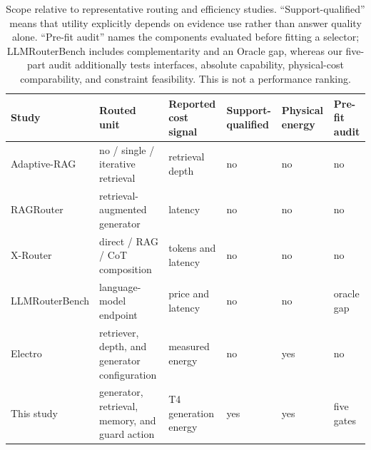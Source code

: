 \begin{table}[t]
\caption{Scope relative to representative routing and efficiency studies. ``Support-qualified'' means that utility explicitly depends on evidence use rather than answer quality alone. ``Pre-fit audit'' names the components evaluated before fitting a selector; LLMRouterBench includes complementarity and an Oracle gap, whereas our five-part audit additionally tests interfaces, absolute capability, physical-cost comparability, and constraint feasibility. This is not a performance ranking.}
\label{tab:related-scope}
\centering
\small
\begin{tabularx}{\textwidth}{@{}lXXlll@{}}
\toprule
Study & Routed unit & Reported cost signal & Support-qualified & Physical energy & Pre-fit audit \\
\midrule
Adaptive-RAG & no / single / iterative retrieval & retrieval depth & no & no & no \\
RAGRouter & retrieval-augmented generator & latency & no & no & no \\
X-Router & direct / RAG / CoT composition & tokens and latency & no & no & no \\
LLMRouterBench & language-model endpoint & price and latency & no & no & oracle gap \\
Electro & retriever, depth, and generator configuration & measured energy & no & yes & no \\
This study & generator, retrieval, memory, and guard action & T4 generation energy & yes & yes & five gates \\
\bottomrule
\end{tabularx}
\end{table}
